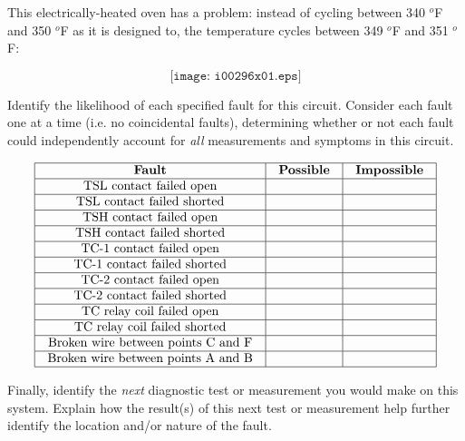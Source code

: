 

This electrically-heated oven has a problem: instead of cycling between 340 $^{o}$F and 350 $^{o}$F as it is designed to, the temperature cycles between 349 $^{o}$F and 351 $^{o}$F:

$$\texttt{[image: i00296x01.eps]}$$

Identify the likelihood of each specified fault for this circuit.  Consider each fault one at a time (i.e. no coincidental faults), determining whether or not each fault could independently account for {\it all} measurements and symptoms in this circuit.


$$\vbox{\offinterlineskip
\halign{\strut
\vrule \quad\hfil # \ \hfil & 
\vrule \quad\hfil # \ \hfil & 
\vrule \quad\hfil # \ \hfil \vrule \cr
\noalign{\hrule}
%
{\bf Fault} & {\bf Possible} & {\bf Impossible} \cr
%
\noalign{\hrule}
%
TSL contact failed open &  &  \cr
%
\noalign{\hrule}
%
TSL contact failed shorted &  &  \cr
%
\noalign{\hrule}
%
TSH contact failed open &  &  \cr
%
\noalign{\hrule}
%
TSH contact failed shorted &  &  \cr
%
\noalign{\hrule}
%
TC-1 contact failed open &  &  \cr
%
\noalign{\hrule}
%
TC-1 contact failed shorted &  &  \cr
%
\noalign{\hrule}
%
TC-2 contact failed open &  &  \cr
%
\noalign{\hrule}
%
TC-2 contact failed shorted &  &  \cr
%
\noalign{\hrule}
%
TC relay coil failed open &  &  \cr
%
\noalign{\hrule}
%
TC relay coil failed shorted &  &  \cr
%
\noalign{\hrule}
%
Broken wire between points C and F &  &  \cr
%
\noalign{\hrule}
%
Broken wire between points A and B &  &  \cr
%
\noalign{\hrule}
} %
}$$ %

Finally, identify the {\it next} diagnostic test or measurement you would make on this system.  Explain how the result(s) of this next test or measurement help further identify the location and/or nature of the fault.






